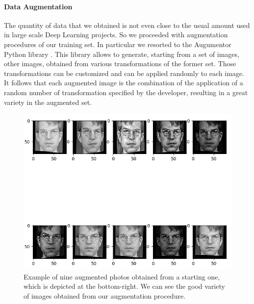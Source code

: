 \paragraph{Data Augmentation}
The quantity of data that we obtained is not even close to the usual amount used in large scale Deep Learning projects. So we proceeded with augmentation procedures of our training set. In particular we resorted to the Augumentor Python library \cite{augmentor}. This library allows to generate, starting from a set of images, other images, obtained from various transformations of the former set. Those transformations can be customized and can be applied randomly to each image. It follows that each augmented image is the combination of the application of a random number of transformation specified by the developer, resulting in a great variety in the augmented set.

\begin{figure}[t]
\includegraphics[width=1\linewidth]{images/augmented.png}
   \caption{Example of nine augmented photos obtained from a starting one, which is depicted at the bottom-right. We can see the good variety of images obtained from our augmentation procedure.}
\label{fig:long}
\label{fig:onecol}
\end{figure}

